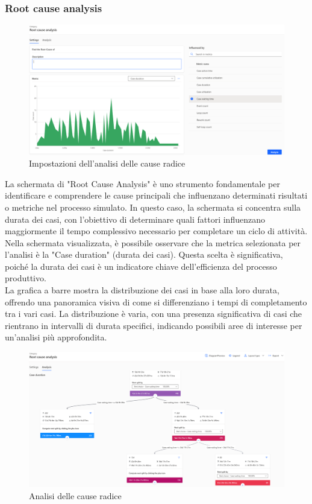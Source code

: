 \documentclass{article}
\begin{document}
\subsubsection{Root cause analysis}
\begin{figure}[H]
    \centering
    \includegraphics[width=\textwidth]{imgMicrosoft/SecondaSimulazione/RootCauseAnalysisSettingsSimulazione2.png}
    \caption{Impostazioni dell'analisi delle cause radice}
    \label{fig:root-cause-analysis-settings}
\end{figure}
La schermata di "Root Cause Analysis" è uno strumento fondamentale per identificare e comprendere le cause principali che influenzano determinati risultati o metriche nel processo simulato. In questo caso, la schermata si concentra sulla durata dei casi, con l'obiettivo di determinare quali fattori influenzano maggiormente il tempo complessivo necessario per completare un ciclo di attività.\\
Nella schermata visualizzata, è possibile osservare che la metrica selezionata per l'analisi è la "Case duration" (durata dei casi). Questa scelta è significativa, poiché la durata dei casi è un indicatore chiave dell'efficienza del processo produttivo.\\
La grafica a barre mostra la distribuzione dei casi in base alla loro durata, offrendo una panoramica visiva di come si differenziano i tempi di completamento tra i vari casi. La distribuzione è varia, con una presenza significativa di casi che rientrano in intervalli di durata specifici, indicando possibili aree di interesse per un'analisi più approfondita.\\
\begin{figure}[H]
    \centering
    \includegraphics[width=\textwidth]{imgMicrosoft/SecondaSimulazione/RootCauseAnalysisSimulazione2.png}
    \caption{Analisi delle cause radice}
    \label{fig:root-cause-analysis}
\end{figure}
\end{document}
